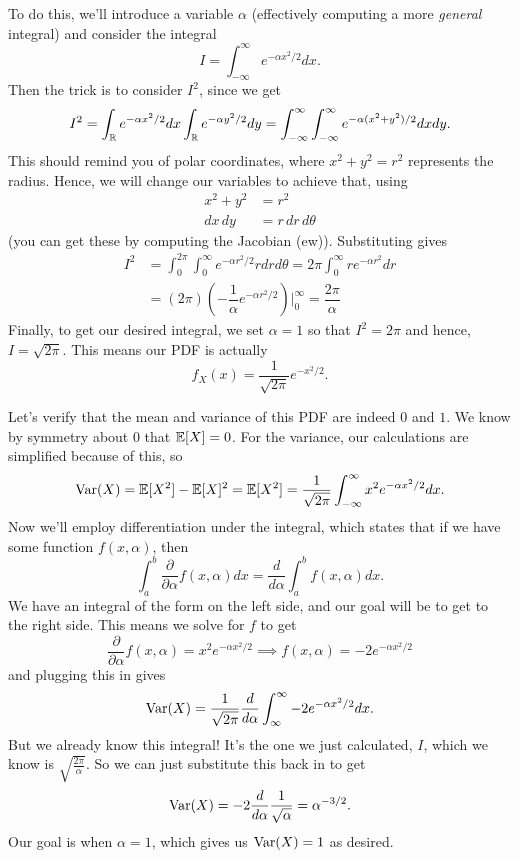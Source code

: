 \documentclass[11 pt]{scrartcl}
\begin{document}
    To do this, we'll introduce a variable $\alpha$ (effectively computing a more \emph{general} integral) and consider the integral 
    \[ I = \int_{-\infty}^\infty e^{-\alpha x^2/2}dx.\] 
    Then the trick is to consider $I^2$, since we get 
    \[ I^2 = \int_{\mathbb R} e^{-\alpha x^2/2} dx \int_{\mathbb R} e^{-\alpha y^2/2} dy  = \int_{-\infty}^\infty \int_{-\infty}^\infty e^{-\alpha (x^2+y^2)/2}dxdy. \] 
    This should remind you of polar coordinates, where $x^2+y^2 = r^2$ represents the radius. Hence, we will change our variables to achieve that, using 
    \begin{align*} 
        x^2 + y^2 &= r^2 \\ 
        dx\, dy &= r\, dr\, d\theta 
    \end{align*}
    (you can get these by computing the Jacobian (ew)). Substituting gives 
\begin{align*} 
    I^2 &= \int_0^{2\pi}\int_0^{\infty} e^{-\alpha r^2/2} r dr d\theta = 2\pi\int_0^\infty re^{-\alpha r^2} dr  \\ 
        &= (2\pi) \left(-\dfrac{1}{\alpha}e^{-\alpha r^2/2}\right) \Big|^{\infty}_0 = \dfrac{2\pi}{\alpha} 
\end{align*}
    Finally, to get our desired integral, we set $\alpha = 1$ so that $I^2 = 2\pi$ and hence, $I = \sqrt{2\pi}$. This means our PDF is actually 
    \[ f_X(x) = \dfrac{1}{\sqrt{2\pi}} e^{-x^2/2}.\] 

    Let's verify that the mean and variance of this PDF are indeed $0$ and $1$. We know by symmetry about 0 that $\mathbb E[X] = 0$. For the variance, our calculations are simplified because of this, so 
    \[ \text{Var}(X) = \mathbb E[X^2] - \mathbb E[X]^2 = \mathbb E[X^2] = \dfrac{1}{\sqrt{2\pi}}\int_{-\infty}^{\infty} x^2 e^{-\alpha x^2/2} dx.\]
    Now we'll employ differentiation under the integral, which states that if we have some function $f(x,\alpha)$, then 
    \[ \int_a^b \dfrac{\partial}{\partial \alpha} f(x,\alpha) dx = \dfrac{d}{d\alpha}\int_a^b f(x,\alpha) dx.\] 
    We have an integral of the form on the left side, and our goal will be to get to the right side. This means we solve for $f$ to get
    \[ \dfrac{\partial}{\partial \alpha} f(x,\alpha) = x^2e^{-\alpha x^2/2} \implies f(x,\alpha) = -2e^{-\alpha x^2/2}\]
    and plugging this in gives 
    \[ \text{Var}(X) = \dfrac{1}{\sqrt{2\pi}} \dfrac{d}{d\alpha}\int_{\infty}^\infty -2e^{-\alpha x^2/2}dx.\] 
    But we already know this integral! It's the one we just calculated, $I$, which we know is $\sqrt{\frac{2\pi}{\alpha}}$. So we can just substitute this back in to get 
    \[ \text{Var}(X) = -2 \dfrac{d}{d\alpha} \dfrac{1}{\sqrt{\alpha}} = \alpha^{-3/2}. \]
    Our goal is when $\alpha = 1$, which gives us $\text{Var}(X) = 1$ as desired. 
\end{document}
